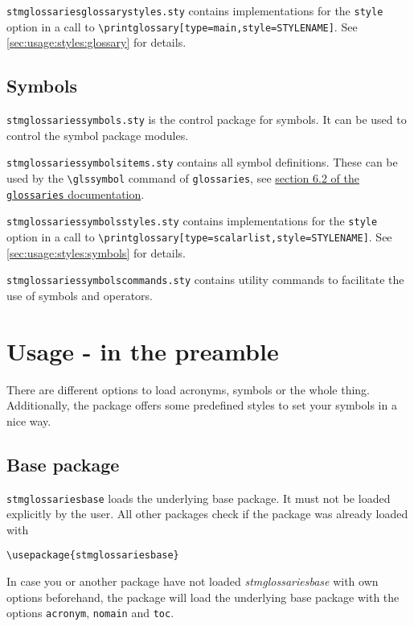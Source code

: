 \documentclass[%
  type=article,%
  layout=koma,%
  hyperref=true,%
  conditionallox=true,%
  conditionalloxnewpage=false,%
  date=true,%
  index=true,%
  listings=true%
]{stmtext}
\begin{document}
\texttt{stmglossariesglossarystyles.sty} contains implementations for the \texttt{style} option in a call to \verb+\printglossary[type=main,style=STYLENAME]+. See \autoref{sec:usage:styles:glossary} for details.

\subsection{Symbols}
\label{sec:contents:symbols}

\texttt{stmglossariessymbols.sty} is the control package for symbols. It can be used to control the symbol package modules.

\texttt{stmglossariessymbolsitems.sty} contains all symbol definitions. These can be used by the \texttt{\textbackslash glssymbol} command of \texttt{glossaries}, see \href{http://ftp.fau.de/ctan/macros/latex/contrib/glossaries/glossaries-user.pdf#section.6.2}{section 6.2 of the \texttt{glossaries} documentation}.

\texttt{stmglossariessymbolsstyles.sty} contains implementations for the \texttt{style} option in a call to \verb+\printglossary[type=scalarlist,style=STYLENAME]+. See \autoref{sec:usage:styles:symbols} for details.

\texttt{stmglossariessymbolscommands.sty} contains utility commands to facilitate the use of symbols and operators.

\section{Usage - in the preamble}
\label{sec:usage:preamble}

There are different options to load acronyms, symbols or the whole thing. Additionally, the package offers some predefined styles to set your symbols in a nice way.

\subsection{Base package}
\label{sec:usage:preamble:base}

\texttt{stmglossariesbase} loads the underlying base package. It must not be loaded explicitly by the user. All other packages check if the package was already loaded with

\begin{verbatim}
\usepackage{stmglossariesbase}
\end{verbatim}

In case you or another package have not loaded \textit{stmglossariesbase} with own options beforehand, the package will load the underlying base package with the options \texttt{acronym}, \texttt{nomain} and \texttt{toc}.
\end{document}

